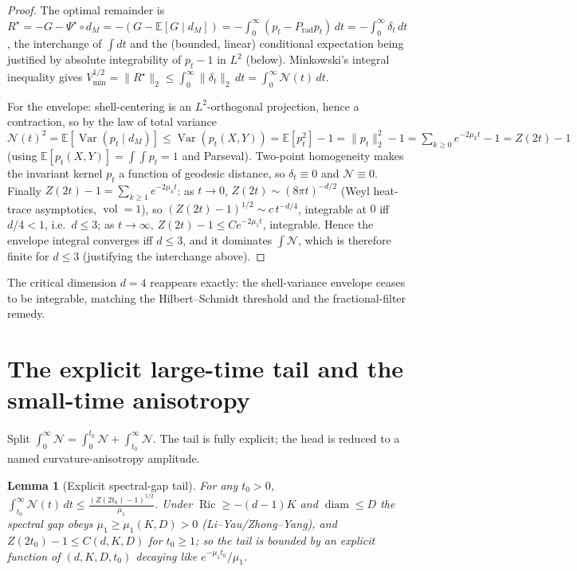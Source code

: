 \documentclass[11pt]{article}
\newtheorem{lemma}[theorem]{Lemma}
\theoremstyle{remark}
\newcommand{\vol}{\operatorname{vol}}
\newcommand{\diam}{\operatorname{diam}}
\newcommand{\dM}{d_M}
\newcommand{\Var}{\operatorname{Var}}
\newcommand{\E}{\mathbb E}
\DeclareMathOperator{\Ric}{Ric}
\begin{document}
\begin{proof}
The optimal remainder is $R^\star=-G-\Psi^\star\circ\dM=-(G-\E[G\mid\dM])
=-\int_0^\infty(p_t-P_{\mathrm{rad}}p_t)\,dt=-\int_0^\infty\delta_t\,dt$, the interchange of
$\int dt$ and the (bounded, linear) conditional expectation being justified by absolute
integrability of $p_t-1$ in $L^2$ (below). Minkowski's integral inequality gives
$V_{\min}^{1/2}=\lVert R^\star\rVert_2\le\int_0^\infty\lVert\delta_t\rVert_2\,dt
=\int_0^\infty\mathcal N(t)\,dt$.

For the envelope: shell-centering is an $L^2$-orthogonal projection, hence a contraction, so
by the law of total variance $\mathcal N(t)^2=\E[\Var(p_t\mid\dM)]\le\Var(p_t(X,Y))
=\E[p_t^2]-1=\lVert p_t\rVert_2^2-1=\sum_{k\ge0}e^{-2\mu_k t}-1=Z(2t)-1$ (using
$\E[p_t(X,Y)]=\int\!\!\int p_t=1$ and Parseval). Two-point homogeneity makes the invariant
kernel $p_t$ a function of geodesic distance, so $\delta_t\equiv0$ and $\mathcal N\equiv0$.
Finally $Z(2t)-1=\sum_{k\ge1}e^{-2\mu_k t}$: as $t\to0$, $Z(2t)\sim(8\pi t)^{-d/2}$ (Weyl
heat-trace asymptotics, $\vol=1$), so $(Z(2t)-1)^{1/2}\sim c\,t^{-d/4}$, integrable at $0$
iff $d/4<1$, i.e.\ $d\le3$; as $t\to\infty$, $Z(2t)-1\le C e^{-2\mu_1 t}$, integrable. Hence
the envelope integral converges iff $d\le3$, and it dominates $\int\mathcal N$, which is
therefore finite for $d\le3$ (justifying the interchange above).
\end{proof}

The critical dimension $d=4$ reappears exactly: the shell-variance envelope ceases to be
integrable, matching the Hilbert--Schmidt threshold and the fractional-filter remedy.

\section{The explicit large-time tail and the small-time anisotropy}

Split $\int_0^\infty\mathcal N=\int_0^{t_0}\mathcal N+\int_{t_0}^\infty\mathcal N$. The tail is
fully explicit; the head is reduced to a named curvature-anisotropy amplitude.

\begin{lemma}[Explicit spectral-gap tail]\label{lem:tail}
For any $t_0>0$,
$\displaystyle\int_{t_0}^\infty\mathcal N(t)\,dt\le\frac{(Z(2t_0)-1)^{1/2}}{\mu_1}$.
Under $\Ric\ge-(d-1)K$ and $\diam\le D$ the spectral gap obeys $\mu_1\ge\mu_1(K,D)>0$
(Li--Yau/Zhong--Yang), and $Z(2t_0)-1\le C(d,K,D)$ for $t_0\ge1$; so the tail is bounded by
an explicit function of $(d,K,D,t_0)$ decaying like $e^{-\mu_1 t_0}/\mu_1$.
\end{lemma}
\end{document}
